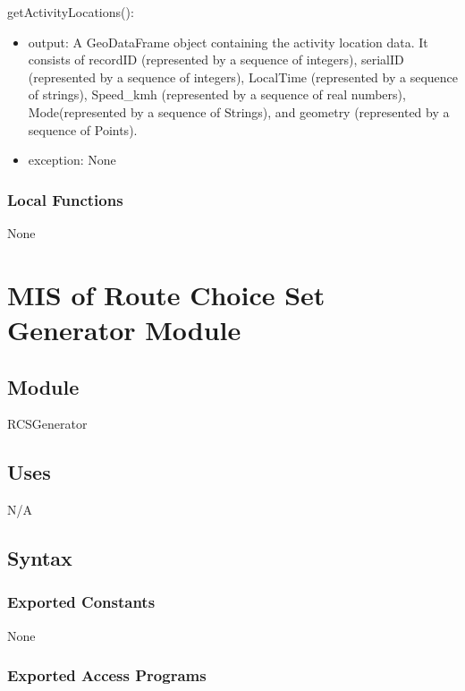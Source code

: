 \documentclass[12pt, titlepage]{article}
\begin{document}
\noindent getActivityLocations():
\begin{itemize}
\item output: A GeoDataFrame object containing the activity location data.  It consists of recordID (represented by a sequence of integers), serialID (represented by a sequence of integers), LocalTime (represented by a sequence of strings), Speed\_kmh (represented by a sequence of real numbers), Mode(represented by a sequence of Strings), and geometry (represented by a sequence of Points).
\item exception: None
\end{itemize}

\subsubsection{Local Functions}

None

\newpage

\section{MIS of Route Choice Set Generator Module} \label{RCSGenerator}

\subsection{Module}
RCSGenerator

\subsection{Uses}
N/A

\subsection{Syntax}

\subsubsection{Exported Constants}
None

\subsubsection{Exported Access Programs}
\end{document}
